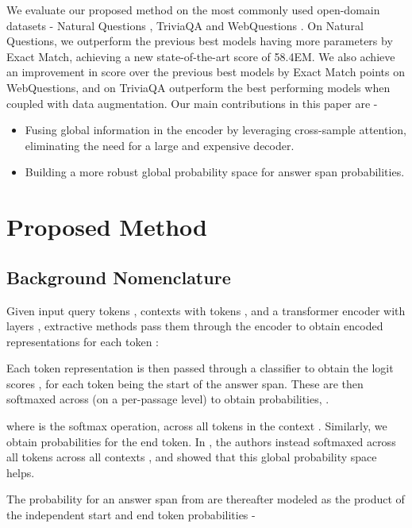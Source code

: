 \documentclass[11pt]{article}
\begin{document}
We evaluate our proposed method on the most commonly used open-domain datasets - Natural Questions \cite{nq}, TriviaQA \cite{joshi2017triviaqa} and WebQuestions \cite{webqa}. On Natural Questions, we outperform the previous best models having  more parameters by  Exact Match, achieving a new state-of-the-art score of 58.4EM. We also achieve an improvement in score over the previous best models by  Exact Match points on WebQuestions, and on TriviaQA outperform the best performing models when coupled with data augmentation. Our main contributions in this paper are -
\vspace{-1mm}
\begin{itemize}
    \item Fusing global information in the encoder by leveraging cross-sample attention, eliminating the need for a large and expensive decoder.
    \vspace{-1mm}
    \item Building a more robust global probability space for answer span probabilities.
\end{itemize} \section{Proposed Method}
\label{proposed_method}

\subsection{Background Nomenclature}

Given input query tokens ,  contexts  with tokens , and a transformer encoder  with  layers , extractive methods pass them through the encoder to obtain encoded representations  for each token :

Each token representation is then passed through a classifier  to obtain the logit scores , for each token being the start of the answer span. These are then softmaxed across  (on a per-passage level) to obtain probabilities, .

where  is the softmax operation, across all tokens  in the context . Similarly, we obtain probabilities  for the end token. 
In \citet{prob-assum}, the authors instead softmaxed across all tokens  across all contexts , and showed that this global probability space helps.

The probability  for an answer span from  are thereafter modeled as the product of the independent start and end token probabilities - 
\end{document}
